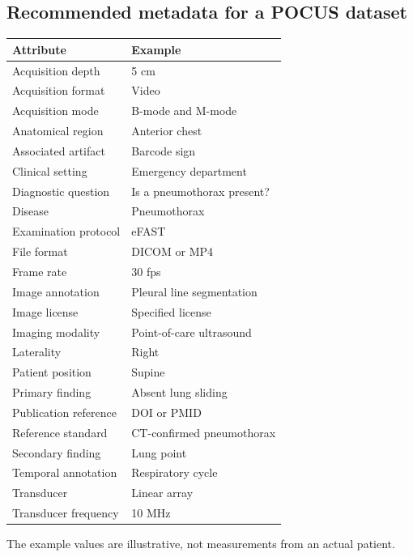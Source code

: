 \subsection{Recommended metadata for a POCUS dataset}
\begin{longtable}{@{}p{}p{}@{}}
\toprule
\textbf{Attribute} & \textbf{Example} \\
\midrule
Acquisition depth & 5 cm \\
Acquisition format & Video \\
Acquisition mode & B-mode and M-mode \\
Anatomical region & Anterior chest \\
Associated artifact & Barcode sign \\
Clinical setting & Emergency department \\
Diagnostic question & Is a pneumothorax present? \\
Disease & Pneumothorax \\
Examination protocol & eFAST \\
File format & DICOM or MP4 \\
Frame rate & 30 fps \\
Image annotation & Pleural line segmentation \\
Image license & Specified license \\
Imaging modality & Point-of-care ultrasound \\
Laterality & Right \\
Patient position & Supine \\
Primary finding & Absent lung sliding \\
Publication reference & DOI or PMID \\
Reference standard & CT-confirmed pneumothorax \\
Secondary finding & Lung point \\
Temporal annotation & Respiratory cycle \\
Transducer & Linear array \\
Transducer frequency & 10 MHz \\
\bottomrule
\end{longtable}
The example values are illustrative, not measurements from an actual patient.

